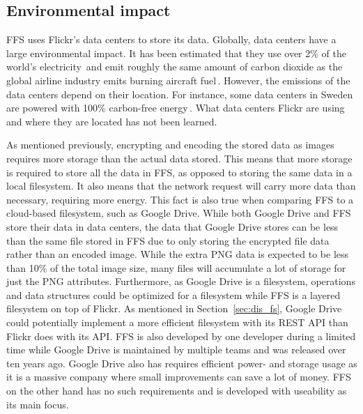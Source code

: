 \subsection{Environmental impact}
\label{subsec:imp_env}
\gls{FFS} uses Flickr's data centers to store its data. Globally, data centers have a large environmental impact. It has been estimated that they use over 2\% of the world's electricity\,\cite{mcleanDataCentersGenerate2020} and emit roughly the same amount of carbon dioxide as the global airline industry emits burning aircraft fuel\,\cite{pearceEnergyHogsCan}. However, the emissions of the data centers depend on their location. For instance, some data centers in Sweden are powered with 100\% carbon-free energy\,\cite{cappellaSwedenSustainableData2022,unfcccEcoDataCenterSwedenUNFCCC}. What data centers Flickr are using and where they are located has not been learned.

As mentioned previously, encrypting and encoding the stored data as images requires more storage than the actual data stored. This means that more storage is required to store all the data in \gls{FFS}, as opposed to storing the same data in a local filesystem. It also means that the network request will carry more data than necessary, requiring more energy. This fact is also true when comparing \gls{FFS} to a \mbox{cloud-based} filesystem, such as Google Drive. While both Google Drive and \gls{FFS} store their data in data centers, the data that Google Drive stores can be less than the same file stored in \gls{FFS} due to only storing the encrypted file data rather than an encoded image. While the extra \gls{PNG} data is expected to be less than 10\% of the total image size, many files will accumulate a lot of storage for just the \gls{PNG} attributes. Furthermore, as Google Drive is a filesystem, operations and data structures could be optimized for a filesystem while \gls{FFS} is a layered filesystem on top of Flickr. As mentioned in Section~\ref{sec:dis_fs}, Google Drive could potentially implement a more efficient filesystem with its REST \gls{API} than Flickr does with its \gls{API}. \gls{FFS} is also developed by one developer during a limited time while Google Drive is maintained by multiple teams and was released over ten years ago. Google Drive also has requires efficient power- and storage usage as it is a massive company where small improvements can save a lot of money. \gls{FFS} on the other hand has no such requirements and is developed with useability as its main focus. 

